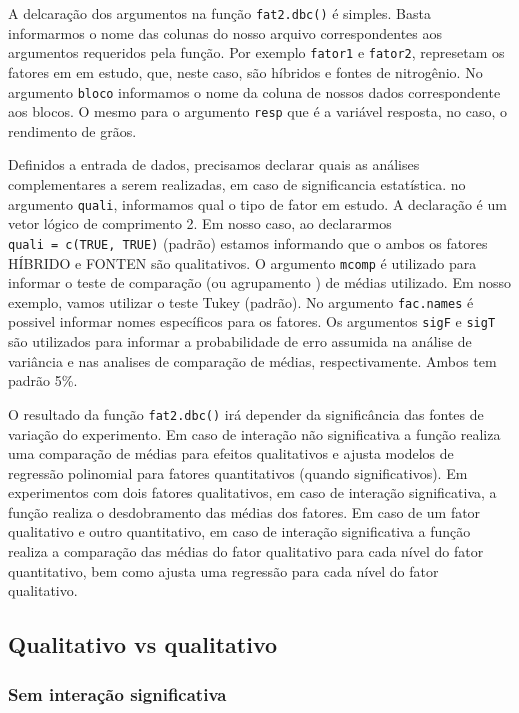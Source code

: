 \documentclass[
]{book}
\begin{document}
A delcaração dos argumentos na função \texttt{fat2.dbc()} é simples. Basta informarmos o nome das colunas do nosso arquivo correspondentes aos argumentos requeridos pela função. Por exemplo \texttt{fator1} e \texttt{fator2}, represetam os fatores em em estudo, que, neste caso, são híbridos e fontes de nitrogênio. No argumento \texttt{bloco} informamos o nome da coluna de nossos dados correspondente aos blocos. O mesmo para o argumento \texttt{resp} que é a variável resposta, no caso, o rendimento de grãos.

Definidos a entrada de dados, precisamos declarar quais as análises complementares a serem realizadas, em caso de significancia estatística. no argumento \texttt{quali}, informamos qual o tipo de fator em estudo. A declaração é um vetor lógico de comprimento 2. Em nosso caso, ao declararmos \texttt{quali\ =\ c(TRUE,\ TRUE)} (padrão) estamos informando que o ambos os fatores HÍBRIDO e FONTEN são qualitativos. O argumento \texttt{mcomp} é utilizado para informar o teste de comparação (ou agrupamento ) de médias utilizado. Em nosso exemplo, vamos utilizar o teste Tukey (padrão). No argumento \texttt{fac.names} é possivel informar nomes específicos para os fatores. Os argumentos \texttt{sigF} e \texttt{sigT} são utilizados para informar a probabilidade de erro assumida na análise de variância e nas analises de comparação de médias, respectivamente. Ambos tem padrão 5\%.

O resultado da função \texttt{fat2.dbc()} irá depender da significância das fontes de variação do experimento. Em caso de interação não significativa  a função realiza uma comparação de médias para efeitos qualitativos e ajusta modelos de regressão polinomial para fatores quantitativos (quando significativos). Em experimentos com dois fatores qualitativos, em caso de interação significativa, a função realiza o desdobramento das médias dos fatores. Em caso de um fator qualitativo e outro quantitativo, em caso de interação significativa a função realiza a comparação das médias do fator qualitativo para cada nível do fator quantitativo, bem como ajusta uma regressão para cada nível do fator qualitativo.

\hypertarget{qualitativo-vs-qualitativo}{%
\subsection{Qualitativo vs qualitativo}\label{qualitativo-vs-qualitativo}}

\hypertarget{sem-interauxe7uxe3o-significativa}{%
\subsubsection{Sem interação significativa}\label{sem-interauxe7uxe3o-significativa}}
\end{document}
